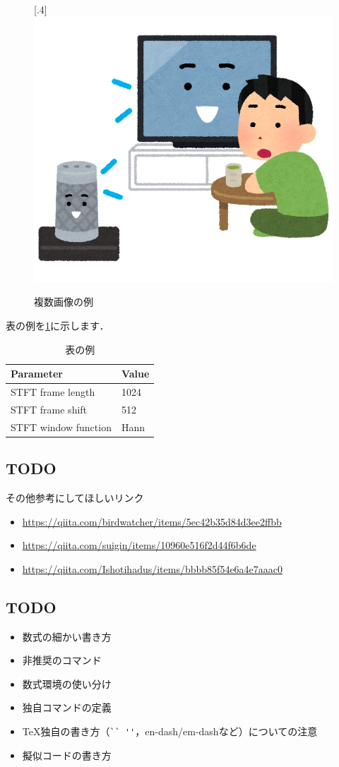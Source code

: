 \begin{figure}[t]
  [.4\linewidth]{\includegraphics[width=.8\linewidth]{fig/smart_speaker_tv_talk.png}}
  \caption{複数画像の例}\label{fig:subcaption}
\end{figure}

表の例を\ref{tab:table}に示します．
\begin{table}[t]
  \centering
  \caption{表の例}\label{tab:table}
  \begin{tabular}{ll}
    \toprule
    Parameter & Value \\
    \midrule
    STFT frame length & 1024 \\
    STFT frame shift & 512 \\
    STFT window function & Hann \\
    \bottomrule
  \end{tabular}
\end{table}

\subsection{TODO}
その他参考にしてほしいリンク
\begin{itemize}
  \item \url{https://qiita.com/birdwatcher/items/5ec42b35d84d3ee2ffbb}
  \item \url{https://qiita.com/suigin/items/10960e516f2d44f6b6de}
  \item \url{https://qiita.com/Ishotihadus/items/bbbb85f54e6a4e7aaac0}
\end{itemize}

\subsection{TODO}
\begin{itemize}
  \item 数式の細かい書き方
  \item 非推奨のコマンド
  \item 数式環境の使い分け
  \item 独自コマンドの定義
  \item TeX独自の書き方（\verb|`` ''|，en-dash/em-dashなど）についての注意
  \item 擬似コードの書き方
\end{itemize}
